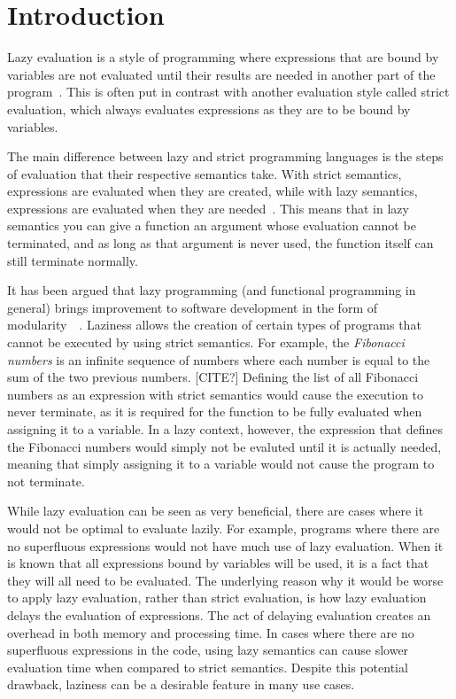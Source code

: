 \chapter{Introduction}
\label{chapter:intro}
Lazy evaluation is a style of programming where expressions that are bound by variables
are not evaluated until their results are needed in another part of the
program~\cite{Lazyeval6:online}. This is often put in contrast with another
evaluation style called strict evaluation, which always evaluates expressions
as they are to be bound by variables. 

The main difference between lazy and strict programming languages is the steps
of evaluation that their respective semantics take. With strict semantics,
expressions are evaluated when they are created, while with lazy semantics,
expressions are evaluated when they are needed~\cite{ThunkHas27:online}.
This means that in lazy semantics you can give a function an argument
whose evaluation cannot be terminated, and as long as
that argument is never used, the function itself can still terminate normally.

It has been argued that lazy programming (and functional programming in general)
brings improvement to software development in the form of
modularity~\cite{Hu1989}~\cite{Hu2015}. Laziness allows the creation of certain
types of programs that cannot be executed by using strict semantics.
For example, the \textit{Fibonacci numbers} is an infinite sequence of numbers
where each number is equal to the sum of the two previous numbers. [CITE?]
Defining the list of all Fibonacci numbers as an expression with strict semantics would
cause the execution to never terminate, as it is required for the function to be
fully evaluated when assigning it to a variable. In a lazy context, however,
the expression that defines the Fibonacci numbers would simply not be evaluted
until it is actually needed, meaning that simply assigning it to a variable
would not cause the program to not terminate.

While lazy evaluation can be seen as very beneficial, there are cases where it
would not be optimal to evaluate lazily. For example, programs where there are
no superfluous expressions would not have much use of lazy evaluation. When it
is known that all expressions bound by variables will be used, it is a fact that
they will all need to be evaluated. The underlying reason why it would be worse
to apply lazy evaluation, rather than strict evaluation, is how lazy evaluation
delays the evaluation of expressions. The act of delaying evaluation creates
an overhead in both memory and processing time.
In cases where there are no superfluous expressions in the code, using lazy
semantics can cause slower evaluation time when compared to
strict semantics. Despite this potential drawback, laziness can be a desirable
feature in many use cases. 

